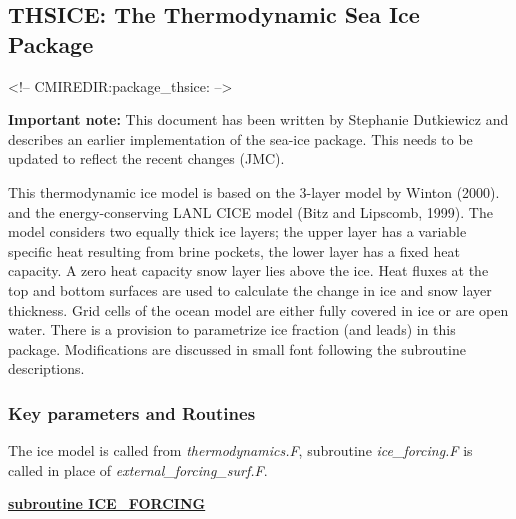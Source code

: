 


% 


\def\deg{$^o$}
\subsection{THSICE: The Thermodynamic Sea Ice Package}
\label{sec:pkg:thsice}
\begin{rawhtml}
<!-- CMIREDIR:package_thsice: -->
\end{rawhtml}

{\bf Important note:}
This document has been written by Stephanie Dutkiewicz
and describes an earlier implementation of the sea-ice package.
This needs to be updated to reflect the recent changes (JMC).

\noindent
This thermodynamic ice model is based on the 3-layer model by Winton (2000).
and the energy-conserving LANL CICE model (Bitz and Lipscomb, 1999).
The model considers two equally thick ice layers; the upper layer has
a variable specific heat resulting from brine pockets,
the lower layer has a fixed heat capacity. A zero heat capacity snow
layer lies above the ice. Heat fluxes at the top and bottom
surfaces are used to calculate the change in ice and snow layer
thickness. Grid cells of the ocean model are 
either fully covered in ice or are open water. There is
a provision to parametrize ice fraction (and leads) in this package.
Modifications are discussed in small font following the
subroutine descriptions.

\subsubsection{Key parameters and Routines}

\noindent
The ice model is called from {\it thermodynamics.F}, subroutine
{\it ice\_forcing.F} is called in place of {\it external\_forcing\_surf.F}.


\vspace{1cm}
\noindent
{\bf \underline{subroutine ICE\_FORCING}}


